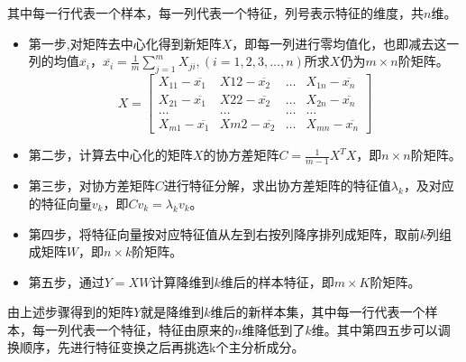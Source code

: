 \par
{其中每一行代表一个样本，每一列代表一个特征，列号表示特征的维度，共$n$维。}
\begin{itemize}
    \item {第一步,对矩阵去中心化得到新矩阵$X$，即每一列进行零均值化，也即减去这一列的均值$\overline{x_i}$，$\overline{x_i}=\frac{1}{m}\sum_{j=1}^{m}{X_{ji}},(i=1,2,3,\dots ,n)$所求$X$仍为$m\times n$阶矩阵。}
    \begin{equation}
    X=\begin{bmatrix}
        X_{11}-\overline{x_1} & X{12}-\overline{x_2} & \dots & X_{1n}-\overline{x_n} \\
        X_{21}-\overline{x_1} & X{22}-\overline{x_2} & \dots & X_{2n}-\overline{x_n} \\
        \dots  & \dots  & \dots & \dots  \\
        X_{m1}-\overline{x_1} & X{m2}-\overline{x_2} & \dots & X_{mn}-\overline{x_n} 
    \end{bmatrix}
\end{equation}
    \item {第二步，计算去中心化的矩阵$X$的协方差矩阵$C=\frac{1}{m-1}{X^{T}X}$，即$n\times n$阶矩阵。}
    \item {第三步，对协方差矩阵$C$进行特征分解，求出协方差矩阵的特征值$\lambda_k$，及对应的特征向量$v_k$，即$Cv_k=\lambda_kv_k$。}
    \item {第四步，将特征向量按对应特征值从左到右按列降序排列成矩阵，取前$k$列组成矩阵$W$，即$n\times k$阶矩阵。}
    \item {第五步，通过$Y=XW$计算降维到$k$维后的样本特征，即$m\times K$阶矩阵。}
\end{itemize}
\par
{由上述步骤得到的矩阵$Y$就是降维到$k$维后的新样本集，其中每一行代表一个样本，每一列代表一个特征，特征由原来的$n$维降低到了$k维$。其中第四五步可以调换顺序，先进行特征变换之后再挑选k个主分析成分。}
